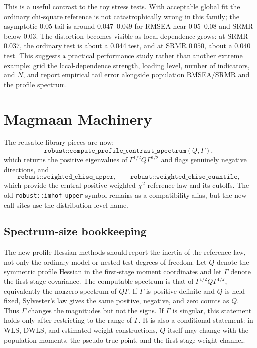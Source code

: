 \documentclass[11pt]{article}
\begin{document}
This is a useful contrast to the toy stress tests. With acceptable global fit
the ordinary chi-square reference is not catastrophically wrong in this family;
the asymptotic 0.05 tail is around \(0.047\)--\(0.049\) for RMSEA near
\(0.05\)--\(0.08\) and SRMR below \(0.03\). The distortion becomes visible as
local dependence grows: at SRMR \(0.037\), the ordinary test is about a 0.044
test, and at SRMR \(0.050\), about a 0.040 test. This suggests a practical
performance study rather than another extreme example: grid the local-dependence
strength, loading level, number of indicators, and \(N\), and report empirical
tail error alongside population RMSEA/SRMR and the profile spectrum.

\section{Magmaan Machinery}

The reusable library pieces are now:
\[
  \texttt{robust::compute\_profile\_contrast\_spectrum}(Q,\Gamma),
\]
which returns the positive eigenvalues of
$\Gamma^{1/2}Q\Gamma^{1/2}$ and flags genuinely negative directions, and
\[
  \texttt{robust::weighted\_chisq\_upper},\qquad
  \texttt{robust::weighted\_chisq\_quantile},
\]
which provide the central positive weighted-\(\chi^2\) reference law and its
cutoffs. The old \texttt{robust::imhof\_upper} symbol remains as a compatibility
alias, but the new call sites use the distribution-level name.

\subsection*{Spectrum-size bookkeeping}

The new profile-Hessian methods should report the inertia of the reference law,
not only the ordinary model or nested-test degrees of freedom. Let \(Q\) denote
the symmetric profile Hessian in the first-stage moment coordinates and let
\(\Gamma\) denote the first-stage covariance. The computable spectrum is that of
\(\Gamma^{1/2}Q\Gamma^{1/2}\), equivalently the nonzero spectrum of
\(Q\Gamma\). If \(\Gamma\) is positive definite and \(Q\) is held fixed,
Sylvester's law gives the same positive, negative, and zero counts as \(Q\).
Thus \(\Gamma\) changes the magnitudes but not the signs. If \(\Gamma\) is
singular, this statement holds only after restricting to the range of
\(\Gamma\). It is also a conditional statement: in WLS, DWLS, and
estimated-weight constructions, \(Q\) itself may change with the population
moments, the pseudo-true point, and the first-stage weight channel.
\end{document}
